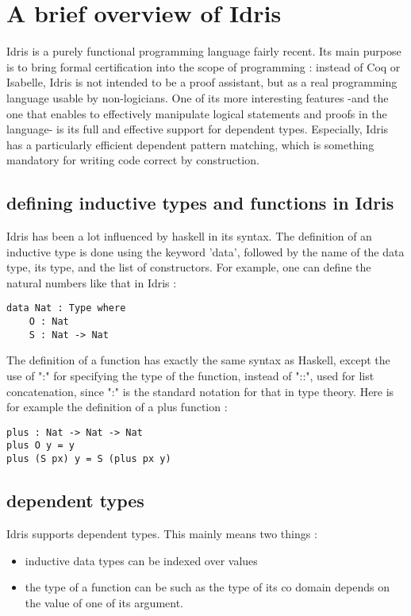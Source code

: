 \section{A brief overview of Idris}


Idris is a purely functional programming language fairly recent. Its main purpose is to bring formal certification into the scope of programming : instead of Coq or Isabelle, Idris is not intended to be a proof assistant, but as a real programming language usable by non-logicians. One of its more interesting features -and the one that enables to effectively manipulate logical statements and proofs in the language- is its full and effective support for dependent types. Especially, Idris has a particularly efficient dependent pattern matching, which is something mandatory for writing code correct by construction.

\subsection{defining inductive types and functions in Idris}

Idris has been a lot influenced by haskell in its syntax.
The definition of an inductive type is done using the keyword 'data', followed by the name of the data type, its type, and the list of constructors.
For example, one can define the natural numbers like that in Idris :

\begin{lstlisting}[caption=inductive data type, captionpos=b, label=lst1:haskell2]
data Nat : Type where
	O : Nat
	S : Nat -> Nat
\end{lstlisting}

The definition of a function has exactly the same syntax as Haskell, except the use of ":" for specifying the type of the function, instead of "::", used for list concatenation, since ":" is the standard notation for that in type theory.
Here is for example the definition of a plus function :

\begin{lstlisting}[caption=recursive function, captionpos=b, label=lst2:haskell2]
plus : Nat -> Nat -> Nat
plus O y = y
plus (S px) y = S (plus px y) 
\end{lstlisting}

\subsection{dependent types}
Idris supports dependent types. This mainly means two things :
\begin{itemize}
\item inductive data types can be indexed over values
\item the type of a function can be such as the type of its co domain depends on the value of one of its argument.
\end{itemize}


